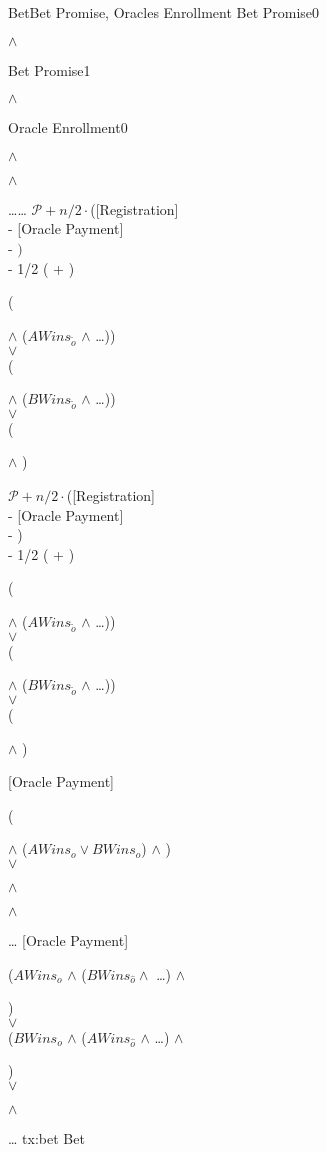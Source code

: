 \transaction
    {Bet}{Bet Promise, Oracles Enrollment}
    {Bet Promise}{0}{\signature{A} $\wedge$ \signature{B}}
    {Bet Promise}{1}{\signature{A} $\wedge$ \signature{B}}
    {Oracle Enrollment}{0}
        {\signature{A} $\wedge$ \signature{B} $\wedge$ \signature{O}}
        {\ldots}{\ldots}{}
    \stopinputs
    {$\mathcal{P} + n/2 \cdot $([Registration] \\
            - [Oracle Payment] \\
            - $)$ \\
            - 1/2 ( + )}
        {(\signature{A} $\wedge$ ($AWins_{\tilde{o}}$ $\wedge$ \ldots {})) \\
                          $\vee$ \\
         (\signature{B} $\wedge$ ($BWins_{\tilde{o}}$ $\wedge$ \ldots {})) \\
                                    $\vee$ \\
         (\signature{A} $\wedge$ )}
    {$\mathcal{P} + n/2 \cdot $([Registration] \\
            - [Oracle Payment] \\
            - ) \\
            - 1/2 ( + )}
        {(\signature{A} $\wedge$ ($AWins_{\tilde{o}}$ $\wedge$ \ldots {})) \\
                          $\vee$ \\
         (\signature{B} $\wedge$ ($BWins_{\tilde{o}}$ $\wedge$ \ldots {})) \\
                                    $\vee$ \\
         (\signature{B} $\wedge$ )}
    {[Oracle Payment]}{(\signature{o} $\wedge$ ($AWins_o \vee BWins_o$) %
                       $\wedge$ ) \\
                       $\vee$  \\
                       \signature{A} $\wedge$ \signature{B} $\wedge$ %
                       }
    {\ldots}{}
    {[Oracle Payment]}{($AWins_o$ $\wedge$ ($BWins_{\hat{o}} \wedge$ %
                         \dots) $\wedge$ \signature{B}) \\
                       $\vee$ \\
                       ($BWins_o$ $\wedge$ ($AWins_{\hat{o}}$ %
                        $\wedge$  \dots) $\wedge$ \signature{A}) \\
                       $\vee$ \\
                        \signature{o} $\wedge$ }
    {\ldots}{}
    \stopoutputs
    {tx:bet}
    {Bet}

